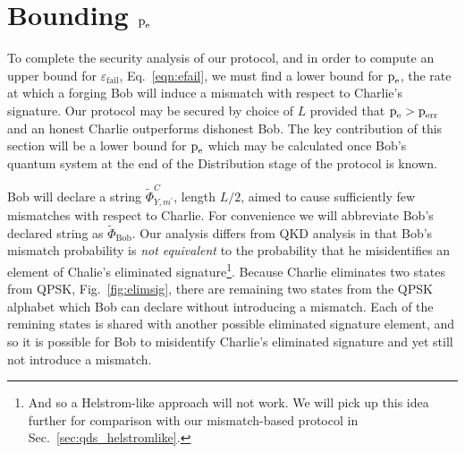 
\section{Bounding $\text{p}_{\text{e}}$}\label{sec:qds_bounding_pe}
To complete the security analysis of our protocol, and in order to compute an upper bound for $\varepsilon_{\text{fail}}$, Eq.~\ref{eqn:efail}, we must find a lower bound for $\text{p}_{\text{e}}$, the rate at which a forging Bob will induce a mismatch with respect to Charlie's signature. Our protocol may be secured by choice of $L$ provided that $\text{p}_{\text{e}} > \text{p}_{\text{err}}$ and an honest Charlie outperforms dishonest Bob. The key contribution of this section will be a lower bound for $\text{p}_{\text{e}}$ which may be calculated once Bob's quantum system at the end of the Distribution stage of the protocol is known.




Bob will declare a string $\tilde{\Phi}_{Y, m^\prime}^C$, length $L/2$,  aimed to cause sufficiently few mismatches with respect to Charlie. For convenience we will abbreviate Bob's declared string as $\tilde{\Phi}_{\text{Bob}}$. %
Our analysis differs from QKD analysis in that Bob's mismatch probability is \emph{not equivalent} to the probability that he misidentifies an element of Chalie's eliminated signature\footnote{And so a Helstrom-like approach  will not work. We will pick up this idea further for comparison with our mismatch-based protocol in Sec.~\ref{sec:qds_helstromlike}.}. Because Charlie eliminates two states from QPSK, Fig.~\ref{fig:elimsig}, there are remaining two states from the QPSK alphabet which Bob can declare without introducing a mismatch. Each of the remining states is shared with another possible eliminated signature element, and so it is possible for Bob to misidentify Charlie's eliminated signature and yet still not introduce a mismatch.

